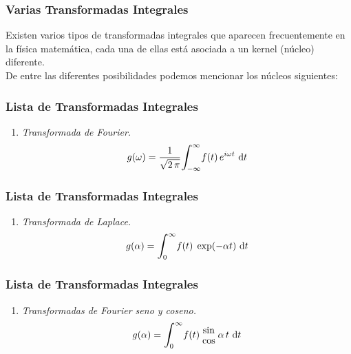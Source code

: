 \documentclass[12pt]{beamer}
\begin{document}
\begin{frame}
\frametitle{Varias Transformadas Integrales}
Existen varios tipos de transformadas integrales que aparecen frecuentemente en la física matemática, \pause cada una de ellas está asociada a un kernel (núcleo) diferente.
\\
\bigskip
\pause
De entre las diferentes posibilidades podemos mencionar los núcleos siguientes:
\end{frame}
\begin{frame}
\frametitle{Lista de Transformadas Integrales}
\begin{enumerate}[<+->]
\item \emph{Transformada de Fourier.}
\begin{align}
g (\omega) = \dfrac{1}{\sqrt{2 \, \pi}} \scaleint{6ex}_{\bs -\infty}^{\infty} f (t) \, e^{i \omega t} \, \dd{t}
\label{eq:ecuacion_07_01}
\end{align}
\seti
\end{enumerate}
\end{frame}
\begin{frame}
\frametitle{Lista de Transformadas Integrales}
\begin{enumerate}[<+->]
\conti
\item \emph{Transformada de Laplace.}
\begin{align}
g (\alpha)= \scaleint{6ex}_{\bs 0}^{\infty} f (t) \; \exp(-\alpha t) \, \dd{t}
\label{eq:ecuacion_7_02}
\end{align}
\seti
\end{enumerate}
\end{frame}
\begin{frame}
\frametitle{Lista de Transformadas Integrales}
\begin{enumerate}[<+->]
\conti
\item \emph{Transformadas de Fourier seno y coseno.}
\begin{align}
g (\alpha)= \scaleint{6ex}_{\bs 0}^{\infty} f (t) \; \substack{ \textstyle \sin \\[0.5em] \textstyle \cos} \; \alpha \, t \,  \dd{t}
\label{eq:ecuacion_7_03}
\end{align}
\seti
\end{enumerate}
\end{frame}
\end{document}
